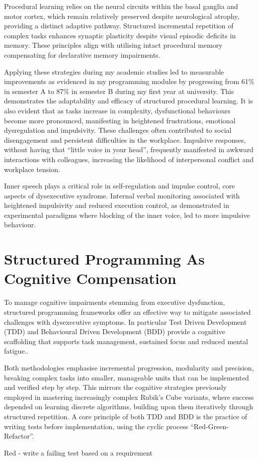 \documentclass{article}
\begin{document}


Procedural learning relies on the neural circuits within the basal ganglia and motor cortex, which remain relatively preserved despite neurological atrophy, providing a distinct adaptive pathway.\cite{doyon2005,peterson2016} Structured incremental repetition of complex tasks enhances synaptic plasticity despite visual episodic deficits in memory.\cite{kandel2014} These principles align with utilising intact procedural memory compensating for declarative memory impairments.\cite{squire2004,vakil2005}

Applying these strategies during my academic studies led to measurable improvements as evidenced in my programming modules by progressing from 61\% in semester A to 87\% in semester B during my first year at university. This demonstrates the adaptability and efficacy of structured procedural learning. It is also evident that as tasks increase in complexity, dysfunctional behaviours become more pronounced, manifesting in heightened frustrations, emotional dysregulation and impulsivity. These challenges often contributed to social disengagement and persistent difficulties in the workplace. Impulsive responses, without having that “little voice in your head”, frequently manifested in awkward interactions with colleagues, increasing the likelihood of interpersonal conflict and workplace tension.

Inner speech plays a critical role in self-regulation and impulse control, core aspects of dysexecutive syndrome. Internal verbal monitoring associated with heightened impulsivity and reduced execution control, as demonstrated in experimental paradigms where blocking of the inner voice, led to more impulsive behaviour.\cite{tullett2010}

\section*{Structured Programming As Cognitive Compensation}
To manage cognitive impairments stemming from executive dysfunction, structured programming frameworks offer an effective way to mitigate associated challenges with dysexecutive symptoms. In particular Test Driven Development (TDD) and Behavioural Driven Development (BDD) provide a cognitive scaffolding that supports task management, sustained focus and reduced mental fatigue.\cite{beck2003,janzen2005}.

Both methodologies emphasise incremental progression, modularity and precision, breaking complex tasks into smaller, manageable units that can be implemented and verified step by step. This mirrors the cognitive strategies previously employed in mastering increasingly complex Rubik’s Cube variants, where success depended on learning discrete algorithms, building upon them iteratively through structured repetition. A core principle of both TDD and BDD is the practice of writing tests before implementation, using the cyclic process “Red-Green-Refactor”.\cite{beck2003}
\\ 
\par
Red - write a failing test based on a requirement
\end{document}
